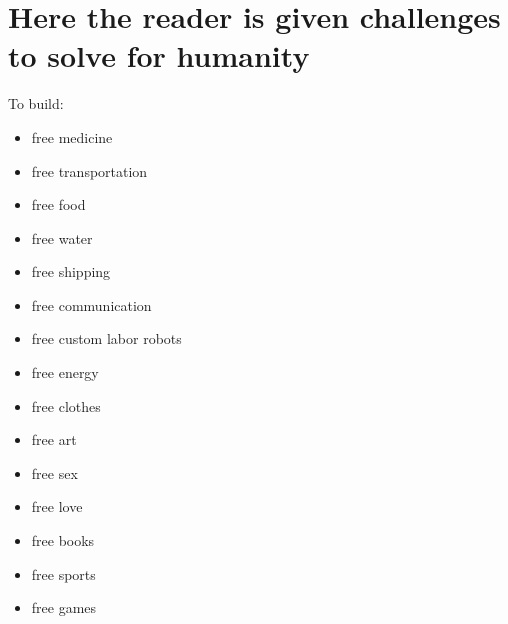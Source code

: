 \section{Here the reader is given challenges to solve for
humanity}\label{here-the-reader-is-given-challenges-to-solve-for-humanity}

To build:

\begin{itemize}
\tightlist
\item
  free medicine
\item
  free transportation
\item
  free food
\item
  free water
\item
  free shipping
\item
  free communication
\item
  free custom labor robots
\item
  free energy
\item
  free clothes
\item
  free art
\item
  free sex
\item
  free love
\item
  free books
\item
  free sports
\item
  free games
\end{itemize}
